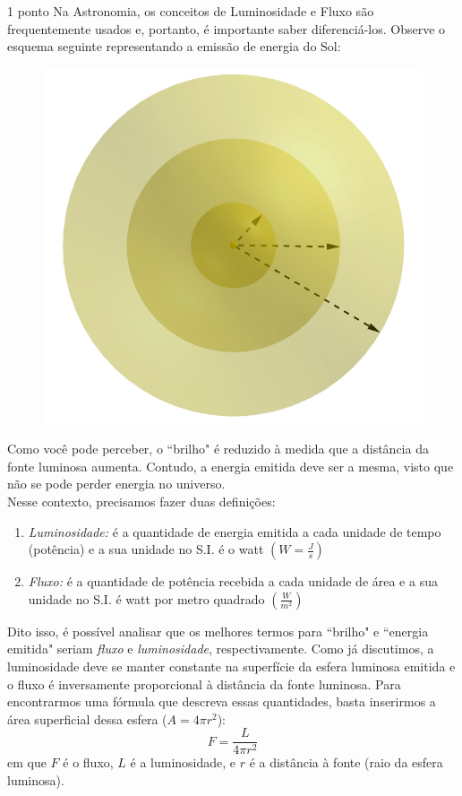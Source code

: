 \documentclass{../lista}
\begin{document}
	\begin{questao}{1 ponto}
		Na Astronomia, os conceitos de Luminosidade e Fluxo são frequentemente usados e, portanto, é importante saber diferenciá-los. Observe o esquema seguinte representando a emissão de energia do Sol:
		\begin{figure}[H]
			\centering
			\includegraphics[scale=0.45]{./img/3.png}
		\end{figure}
		Como você pode perceber, o ``brilho" é reduzido à medida que a distância da fonte luminosa aumenta. Contudo, a energia emitida deve ser a mesma, visto que não se pode perder energia no universo. \\
		Nesse contexto, precisamos fazer duas definições:
		\begin{enumerate}
			\item \textit{Luminosidade:} é a quantidade de energia emitida a cada unidade de tempo (potência) e a sua unidade no S.I. é o watt $\left( W=\frac{J}{s} \right)$
			\item \textit{Fluxo:} é a quantidade de potência recebida a cada unidade de área e a sua unidade no S.I. é watt por metro quadrado $\left( \frac{W}{m^2} \right)$
		\end{enumerate}
		Dito isso, é possível analisar que os melhores termos para ``brilho" e ``energia emitida" seriam \textit{fluxo} e \textit{luminosidade}, respectivamente. Como já discutimos, a luminosidade deve se manter constante na superfície da esfera luminosa emitida e o fluxo é inversamente proporcional à distância da fonte luminosa. Para encontrarmos uma fórmula que descreva essas quantidades, basta inserirmos a área superficial dessa esfera ($A=4 \pi r^2$):
		\begin{equation}
			F = \frac{L}{4 \pi r^2}
		\end{equation}
		em que $F$ é o fluxo, $L$ é a luminosidade, e $r$ é a distância à fonte (raio da esfera luminosa).


\end{questao}
\end{document}

